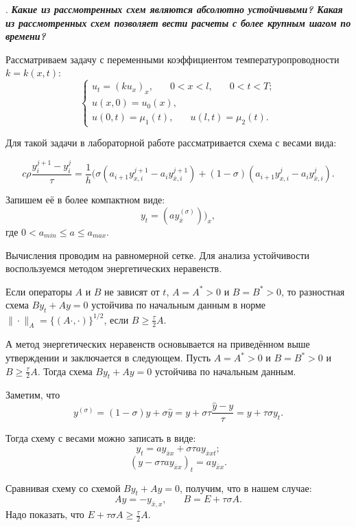 \documentclass[12pt, a4paper]{article}
\newcounter{mycounter}
\newcommand{\quastion}[1]{%
	\stepcounter{mycounter}%
	\textbf{\themycounter}.  %
	\textbf{\textit{#1}}
	
}
\begin{document}
	
	\clearpage %
	\quastion{Какие из рассмотренных схем являются абсолютно устойчивыми? Какая из рассмотренных схем позволяет вести расчеты с более крупным шагом по времени?}
	
	Рассматриваем задачу с переменными коэффициентом температуропроводности $k=k(x,t)$:
	\[
	\begin{cases}
		u_t = (ku_x)_x, \phantom{xxx} 0<x<l, \phantom{xxx} 0<t<T; \\
		u(x,0) = u_0(x), \\
		u(0,t)=\mu_1(t), \phantom{xxx} u(l,t)=\mu_2(t).
	\end{cases}
	\]
	
	Для такой задачи в лабораторной работе рассматривается схема с весами вида:
	
	\begin{equation*}
		c \rho \frac{y^{j+1}_i - y^{j}_i}{\tau} = \frac{1}{h} (\sigma(a_{i+1} y^{j+1}_{x,i} - a_{i} y^{j+1}_{\bar{x},i}) + (1-\sigma)(a_{i+1} y^{j}_{x,i} - a_{i} y^{j}_{\bar{x},i}).
	\end{equation*}
	
	Запишем её в более компактном виде:
	\[
	y_t = (ay^{(\sigma)}_{\bar{x}}))_x,
	\]
	где $0<a_{min} \le a \le a_{max}$. 
	
	Вычисления проводим на равномерной сетке. Для анализа устойчивости воспользуемся методом энергетических неравенств. 
	
	Если операторы $A$ и $B$ не зависят от $t$, $A=A^*>0$ и $B=B^*>0$, то разностная схема $By_t+Ay=0$ устойчива по начальным данным в норме $\|\cdot\|_{A}=\{(A\cdot, \cdot)\}^{1/2}$, если $B\ge \frac{\tau}{2}A$.
	
	А метод энергетических неравенств основывается на приведённом выше утверждении и заключается в следующем.	
	Пусть $A=A^*>0$ и $B=B^*>0$ и $B\ge \frac{\tau}{2}A$. Тогда схема  $By_t+Ay=0$ устойчива по начальным данным.
	
	Заметим, что
	\[
	y^{(\sigma)} =(1-\sigma)y + \sigma \hat{y}= y + \sigma\tau \frac{\hat{y}-y}{\tau}= y+\tau \sigma y_t.
	\]
	
	Тогда схему с весами можно записать в виде:
	\[
	y_t = a y_{\bar{x}x}+\sigma\tau a y_{\bar{x}xt};
	\]
	\[
	(y-\sigma\tau a y_{\bar{x}x})_t = a y_{\bar{x}x}.
	\]
	
	Сравнивая схему со схемой $By_t+Ay=0$, получим, что в нашем случае:
	\[
	Ay = - y_{\bar{x},x}, \phantom{xxx} B = E+\tau\sigma A.
	\]
	Надо показать, что $E+\tau\sigma A \ge \frac\tau2 A$.
	
\end{document}
